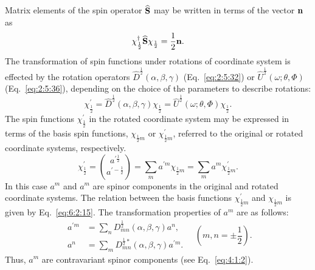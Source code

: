 Matrix elements of the spin operator $\widehat{\mathbf{S}}$ may be written in terms of the vector $\mathbf{n}$ as
\begin{equation}
\chi_{\frac{1}{2}}^{\dagger} \widehat{\mathbf{S}} \chi_{\frac{1}{2}}=\frac{1}{2} \mathbf{n} . \label{eq:6:2:43}
\end{equation}
The transformation of spin functions under rotations of coordinate system is effected by the rotation operators $\widehat{D}^{\frac{1}{2}}(\alpha, \beta, \gamma)$ (Eq.~\eqref{eq:2:5:32}) or $\widehat{U}^{\frac{1}{2}}(\omega ; \theta, \Phi)$ (Eq.~\eqref{eq:2:5:36}), depending on the choice of the parameters to describe rotations:
\begin{equation}
\chi_{\frac{1}{2}}^{\prime}=\widehat{D}^{\frac{1}{2}}(\alpha, \beta, \gamma) \chi_{\frac{1}{2}}=\widehat{U}^{\frac{1}{2}}(\omega ; \theta, \Phi) \chi_{\frac{1}{2}} . \label{eq:6:2:44}
\end{equation}
The spin functions $\chi_{\frac{1}{2}}^{\prime}$ in the rotated coordinate system may be expressed in terms of the basis spin functions, $\chi_{\frac{1}{2} m}$ or $\chi_{\frac{1}{2} m}^{\prime}$, referred to the original or rotated coordinate systems, respectively.
\begin{equation}
\chi_{\frac{1}{2}}^{\prime}=\binom{a^{\prime \frac{1}{2}}}{a^{\prime-\frac{1}{2}}}=\sum_{\dot{m}} a^{\prime m} \chi_{\frac{1}{2} m}=\sum_{m} a^{m} \chi_{\frac{1}{2} m}^{\prime} . \label{eq:6:2:45}
\end{equation}
In this case $a^{m}$ and $a^{m}$ are spinor components in the original and rotated coordinate systems. The relation between the basis functions $\chi_{\frac{1}{2} m}^{\prime}$ and $\chi_{\frac{1}{2} m}$ is given by Eq.~\eqref{eq:6:2:15}. The transformation properties of $a^{m}$ are as follows:
\begin{equation}
\begin{aligned}
a^{\prime m} & =\sum_{n} D_{m n}^{\frac{1}{2}}(\alpha, \beta, \gamma) a^{n}, \\
a^{n} & =\sum_{m} D_{m n}^{\frac{1}{2} *}(\alpha, \beta, \gamma) a^{\prime m} . 
\end{aligned}\quad\left(m, n= \pm \frac{1}{2}\right) .
\end{equation}
Thus, $a^{m}$ are contravariant spinor components (see Eq.~\eqref{eq:4:1:2}).

